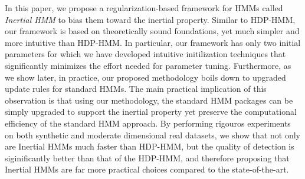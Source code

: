 In this paper, we propose a regularization-based framework for HMMs called
\emph{Inertial HMM} to bias them toward the inertial property. Similar to
HDP-HMM, our framework is based on theoretically sound foundations, yet much
simpler and more intuitive than HDP-HMM. In particular, our framework has only
two initial parameters for which we have developed intuitive initilization
techniques that significantly minimizes the effort needed for parameter tuning.
Furthermore, as we show later, in practice, our proposed
methodology boils down to upgraded update rules for standard HMMs. The main
practical implication of this observation is that using our methodology, the
standard HMM packages can be simply upgraded to support the inertial property yet preserve the
computational efficiency of the standard HMM approach. By performing rigouros
experiments on both synthetic and moderate dimensional real datasets, we show
that not only are Inertial HMMs much faster than HDP-HMM, but the quality of
detection is siginificantly better than that of the HDP-HMM, and therefore
proposing that Inertial HMMs are far more practical choices compared to the
state-of-the-art.
